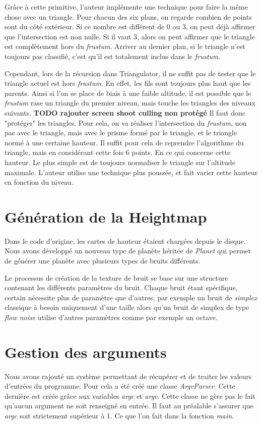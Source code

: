   Grâce à cette primitive, l'auteur implémente une technique pour faire la même chose avec un triangle. Pour chacun des six plans, on regarde combien de points sont du côté extérieur. Si ce nombre est différent de 0 ou 3, on peut déjà affirmer que l'intersection est non nulle. Si il vaut 3, alors on peut affirmer que le triangle est complètement hors du \emph{frustum}. Arriver au dernier plan, si le triangle n'est toujours pas classifié, c'est qu'il est totalement inclus dans le \emph{frustum}.
  
  Cependant, lors de la récursion dans Triangulator, il ne suffit pas de tester que le triangle actuel est hors \emph{frustum}. En effet, les fils sont toujours plus haut que les parents. Ainsi si l'on se place de biais à une faible altitude, il est possible que le \emph{frustum} rase un triangle du premier niveau, mais touche les triangles des niveaux suivants. 
  \textbf{TODO rajouter screen shoot culling non protégé}
  Il faut donc "protéger" les triangles. Pour cela, on va réaliser l'intersection du \emph{frustum}, non pas avec le triangle, mais avec le prisme formé par le triangle, et le triangle normé à une certaine hauteur. Il suffit pour cela de reprendre l'algorithme du triangle, mais en considérant cette fois 6 points.
  En ce qui concerne cette hauteur. Le plus simple est de toujours normaliser le triangle sur l'altitude maximale. L'auteur utilise une technique plus poussée, et fait varier cette hauteur en fonction du niveau.  
  
  \section{Génération de la Heightmap}
  
  Dans le code d'origine, les cartes de hauteur étaient chargées depuis le disque. Nous avons développé un nouveau type de planète héritée de \textit{Planet} qui permet de générer une planète avec plusieurs types de bruits différents.
  
  Le processus de création de la texture de bruit se base sur une structure contenant les différents paramètres du bruit.
  Chaque bruit étant spécifique, certain nécessite plus de paramètre que d'autres, par exemple un bruit de \textit{simplex} classique à besoin uniquement d'une taille alors qu'un bruit
  de simplex de type \textit{flow noise} utilise d'autres paramètres comme par exemple un octave. 
  
  \section{Gestion des arguments}
  Nous avons rajouté un système permettant de récupérer et de traiter les valeurs d'entrées du programme.
  Pour cela a été créé une classe \textit{ArgvParser}. Cette dernière est créée grâce aux variables \textit{argc} et \textit{argv}. 
  Cette classe ne gère pas le fait qu'aucun argument ne soit renseigné en entrée. Il faut au préalable s'assurer que \textit{argc} soit strictement supérieur à 1. Ce que l'on fait dans la fonction \textit{main}.\\
  
